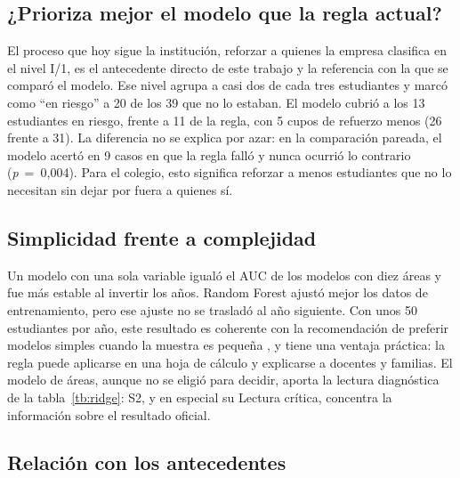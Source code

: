 \documentclass[10pt,letterpaper,twocolumn]{article}
\newcommand{\parencite}{\citep}
\begin{document}
\subsection{¿Prioriza mejor el modelo que la regla actual?}

El proceso que hoy sigue la institución, reforzar a quienes la empresa clasifica en el nivel I/1, es el antecedente directo de este trabajo y la referencia con la que se comparó el modelo. Ese nivel agrupa a casi dos de cada tres estudiantes y marcó como \enquote{en riesgo} a 20 de los 39 que no lo estaban. El modelo cubrió a los 13 estudiantes en riesgo, frente a 11 de la regla, con 5 cupos de refuerzo menos (26 frente a 31). La diferencia no se explica por azar: en la comparación pareada, el modelo acertó en 9 casos en que la regla falló y nunca ocurrió lo contrario (\textit{p}~=~0,004). Para el colegio, esto significa reforzar a menos estudiantes que no lo necesitan sin dejar por fuera a quienes sí.

\subsection{Simplicidad frente a complejidad}

Un modelo con una sola variable igualó el AUC de los modelos con diez áreas y fue más estable al invertir los años. Random Forest ajustó mejor los datos de entrenamiento, pero ese ajuste no se trasladó al año siguiente. Con unos 50 estudiantes por año, este resultado es coherente con la recomendación de preferir modelos simples cuando la muestra es pequeña \parencite{hastie2009elements}, y tiene una ventaja práctica: la regla puede aplicarse en una hoja de cálculo y explicarse a docentes y familias. El modelo de áreas, aunque no se eligió para decidir, aporta la lectura diagnóstica de la tabla~\ref{tb:ridge}: S2, y en especial su Lectura crítica, concentra la información sobre el resultado oficial.

\subsection{Relación con los antecedentes}
\end{document}
